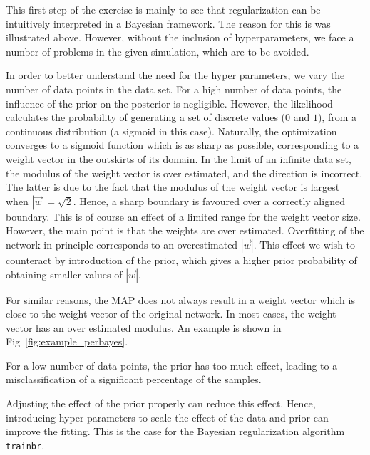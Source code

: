 \documentclass[pdftex,11pt,a4paper]{article}
\begin{document}
This first step of the exercise is mainly to see that regularization can be intuitively interpreted in a Bayesian framework. The reason for this is was illustrated above. However, without the inclusion of hyperparameters, we face a number of problems in the given simulation, which are to be avoided.

In order to better understand the need for the hyper parameters, we vary the number of data points in the data set. For a high number of data points, the influence of the prior on the posterior is negligible. However, the likelihood calculates the probability of generating a set of discrete values ($0$ and $1$), from a continuous distribution (a sigmoid in this case). Naturally, the optimization converges to a sigmoid function which is as sharp as possible, corresponding to a weight vector in the outskirts of its domain. In the limit of an infinite data set, the modulus of the weight vector is over estimated, and the direction is incorrect. The latter is due to the fact that the modulus of the weight vector is largest when $|\vec{w}| = \sqrt{2}$. Hence, a sharp boundary is favoured over a correctly aligned boundary. This is of course an effect of a limited range for the weight vector size. However, the main point is that the weights are over estimated. Overfitting of the network in principle corresponds to an overestimated $|\vec{w}|$. This effect we wish to counteract by introduction of the prior, which gives a higher prior probability of obtaining smaller values of $|\vec{w}|$.

For similar reasons, the MAP does not always result in a weight vector which is close to the weight vector of the original network. In most cases, the weight vector has an over estimated modulus. An example is shown in Fig~\ref{fig:example_perbayes}.  

For a low number of data points, the prior has too much effect, leading to a misclassification of a significant percentage of the samples.

Adjusting the effect of the prior properly can reduce this effect. Hence, introducing hyper parameters to scale the effect of the data and prior can improve the fitting. This is the case for the Bayesian regularization algorithm \texttt{trainbr}.
\end{document}
